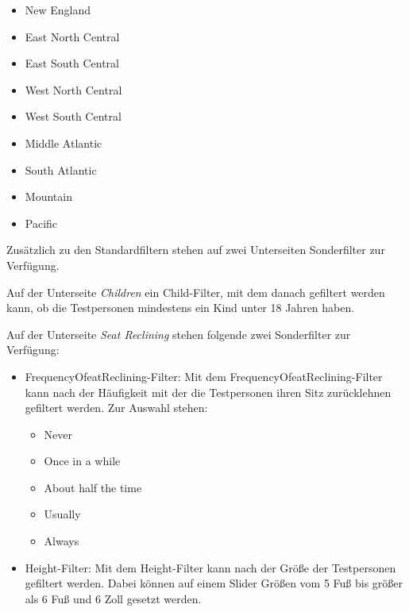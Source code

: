 \documentclass{mi-seminar}
\begin{document}
\begin{itemize}
	\begin{itemize}
	\item New England
	\item East North Central
	\item East South Central
	\item West North Central
	\item West South Central
	\item Middle Atlantic
	\item South Atlantic
	\item Mountain
	\item Pacific
	\end{itemize}
\end{itemize}

Zusätzlich zu den Standardfiltern stehen auf zwei Unterseiten Sonderfilter zur Verfügung. 

Auf der Unterseite \textit{Children} ein Child-Filter, mit dem danach gefiltert werden kann, ob die Testpersonen mindestens ein Kind unter 18 Jahren haben. 

Auf der Unterseite \textit{Seat Reclining} stehen folgende zwei Sonderfilter zur Verfügung: 
\begin{itemize}
\item FrequencyOfeatReclining-Filter: Mit dem FrequencyOfeatReclining-Filter kann nach der Häufigkeit mit der die Testpersonen ihren Sitz zurücklehnen gefiltert werden. Zur Auswahl stehen:
	\begin{itemize}
	\item Never
	\item Once in a while
	\item About half the time
	\item Usually
	\item Always
	\end{itemize}
\item Height-Filter: Mit dem Height-Filter kann nach der Größe der Testpersonen gefiltert werden. Dabei können auf einem Slider Größen vom 5 Fuß bis größer als 6 Fuß und 6 Zoll gesetzt werden.
\end{itemize} 
\end{document}
